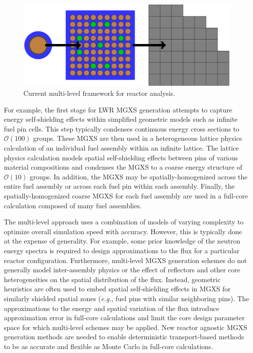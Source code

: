 \begin{figure}
\centering
\includegraphics[width=0.9\linewidth]{figures/intro/multi-step-flow-chart}
\caption[Multi-level approach to reactor analysis]{Current multi-level framework for reactor analysis.}
\label{fig:chap1-multi-level-flow-chart}
\end{figure}

For example, the first stage for \ac{LWR} \ac{MGXS} generation attempts to capture energy self-shielding effects within simplified geometric models such as infinite fuel pin cells. This step typically condenses continuous energy cross sections to $\mathcal{O}(100)$ groups. These \ac{MGXS} are then used in a heterogeneous lattice physics calculation of an individual fuel assembly within an infinite lattice. The lattice physics calculation models spatial self-shielding effects between pins of various material compositions and condenses the \ac{MGXS} to a coarse energy structure of $\mathcal{O}(10)$ groups. In addition, the \ac{MGXS} may be spatially-homogenized across the entire fuel assembly or across each fuel pin within each assembly. Finally, the spatially-homogenized coarse \ac{MGXS} for each fuel assembly are used in a full-core calculation composed of many fuel assemblies.

The multi-level approach uses a combination of models of varying complexity to optimize overall simulation speed with accuracy. However, this is typically done at the expense of generality. For example, some prior knowledge of the neutron energy spectra is required to design approximations to the flux for a particular reactor configuration. Furthermore, multi-level \ac{MGXS} generation schemes do not generally model inter-assembly physics or the effect of reflectors and other core heterogeneities on the spatial distribution of the flux. Instead, geometric heuristics are often used to embed spatial self-shielding effects in \ac{MGXS} for similarly shielded spatial zones (\textit{e.g.}, fuel pins with similar neighboring pins). The approximations to the energy and spatial variation of the flux introduce approximation error in full-core calculations and limit the core design parameter space for which multi-level schemes may be applied. New reactor agnostic \ac{MGXS} generation methods are needed to enable deterministic transport-based methods to be as accurate and flexible as Monte Carlo in full-core calculations.

